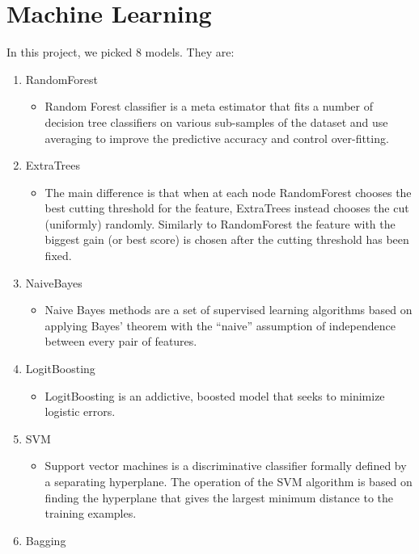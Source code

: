 \chapter{Machine Learning}
In this project, we picked 8 models. They are:
\begin{enumerate}
    \item RandomForest
        \begin{itemize}
            \item Random Forest classifier is a meta estimator that fits a number of decision tree classifiers on various sub-samples of the dataset and use averaging to improve the predictive accuracy and control over-fitting.
        \end{itemize}
    \item ExtraTrees
        \begin{itemize}
            \item  The main difference is that when at each node RandomForest chooses the best cutting threshold for the feature, ExtraTrees instead chooses the cut (uniformly) randomly. Similarly to RandomForest the feature with the biggest gain (or best score) is chosen after the cutting threshold has been fixed.
        \end{itemize}
    \item NaiveBayes
        \begin{itemize}
            \item Naive Bayes methods are a set of supervised learning algorithms based on applying Bayes’ theorem with the “naive” assumption of independence between every pair of features.
        \end{itemize}
    \item LogitBoosting
        \begin{itemize}
            \item LogitBoosting is an addictive, boosted model that seeks to minimize logistic errors.
        \end{itemize}
    \item SVM
        \begin{itemize}
            \item Support vector machines is a discriminative classifier formally defined by a separating hyperplane. The operation of the SVM algorithm is based on finding the hyperplane that gives the largest minimum distance to the training examples.
        \end{itemize}
    \item Bagging
        \begin{itemize}

\end{itemize}
\end{enumerate}
